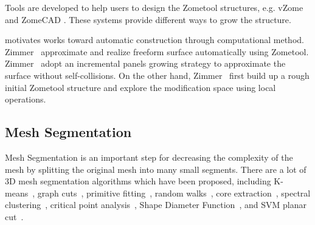 Tools are developed to help users to design the Zometool structures, e.g.\chinky{,} vZome \cite{SVZ} and ZomeCAD \cite{ESZ}.
These systems provide different ways to grow the structure.
%

 motivates works toward automatic construction through computational method.
Zimmer~\cite{zimmer:2014:Zometool,zimmer:2014:tvcg} approximate and realize freeform surface automatically using Zometool.
Zimmer~\cite{zimmer:2014:tvcg} adopt an incremental panels growing strategy to approximate the surface without self-collisions.
On the other hand, Zimmer~\cite{zimmer:2014:Zometool} first build up a rough initial Zometool structure and explore the modification space using local operations. 


\subsection{Mesh Segmentation}
Mesh Segmentation is an important step for decreasing the complexity of the mesh by splitting the original mesh into many small segments. 
There are a lot of 3D mesh segmentation algorithms which have been proposed, including K-means~\cite{shlafman:2002:metamorphosis}, graph cuts~\cite{boykov:2004:experimental, golovinskiy:2008:randomized}, primitive fitting~\cite{attene2006hierarchical}, random walks~\cite{lai2008fast}, core extraction~\cite{katz2005mesh}, spectral clustering~\cite{liu2004segmentation}, critical point analysis~\cite{lin2007visual}, Shape Diameter Function~\cite{shapira:2008:consistent}, and SVM planar cut~\cite{wang2016improved}.

